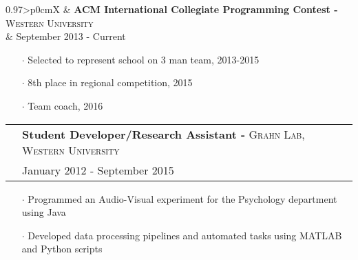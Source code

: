 \documentclass[letterpaper, oneside, final]{scrartcl} %
\newcommand{\gray}{\rowcolor[gray]{.90}} %
\begin{document}
\begin{center}
\vspace{-0.05cm}

\begin{tabularx}{0.97\linewidth}{>{\raggedleft\scshape}p{0cm}X}
\gray & \textbf{ACM International Collegiate Programming Contest -} \textsc{Western University}\\
\gray & {September 2013 - Current}\	\
\end{tabularx}
\vspace{-0.1cm}
\begin{itemize} \itemsep-0.2cm
\item[$\cdot$] Selected to represent school on 3 man team, 2013-2015\\ \item[$\cdot$] 8th place in regional competition, 2015 \\
\item[$\cdot$] Team coach, 2016 \\
\end{itemize}


\vspace{-0.05cm}

\begin{tabularx}{0.97\linewidth}{>{\raggedleft\scshape}p{0cm}X}
\gray & \textbf{Student Developer/Research Assistant -} \textsc{Grahn Lab, Western University}\\
\gray & {January 2012 - September 2015}\\
\end{tabularx}
\vspace{-0.1cm}
\begin{itemize} \itemsep-0.2cm
\item[$\cdot$] Programmed an Audio-Visual experiment for the Psychology department using Java
\item[$\cdot$] Developed data processing pipelines and automated tasks using MATLAB and Python scripts

\end{itemize}


\end{center}
\end{document}

